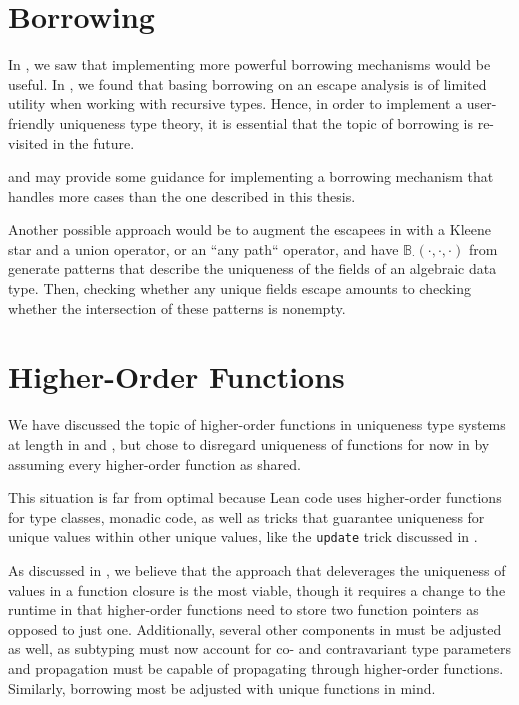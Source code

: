 \section{Borrowing}
In , we saw that implementing more powerful borrowing mechanisms would be useful. In , we found that basing borrowing on an escape analysis is of limited utility when working with recursive types. Hence, in order to implement a user-friendly uniqueness type theory, it is essential that the topic of borrowing is re-visited in the future.

\cite{spiwack_linearly_2022} and \cite{weiss_oxide_2021} may provide some guidance for implementing a borrowing mechanism that handles more cases than the one described in this thesis.

Another possible approach would be to augment the escapees in  with a Kleene star and a union operator, or an ``any path`` operator, and have $\mathbb{B}_\cdot(\cdot, \cdot, \cdot)$ from  generate patterns that describe the uniqueness of the fields of an algebraic data type. Then, checking whether any unique fields escape amounts to checking whether the intersection of these patterns is nonempty.

\section{Higher-Order Functions}
We have discussed the topic of higher-order functions in uniqueness type systems at length in  and , but chose to disregard uniqueness of functions for now in  by assuming every higher-order function as shared. 

This situation is far from optimal because Lean code uses higher-order functions for type classes, monadic code, as well as tricks that guarantee uniqueness for unique values within other unique values, like the \lstinline|update| trick discussed in . 

As discussed in , we believe that the approach that deleverages the uniqueness of values in a function closure is the most viable, though it requires a change to the runtime in that higher-order functions need to store two function pointers as opposed to just one. Additionally, several other components in  must be adjusted as well, as subtyping must now account for co- and contravariant type parameters and propagation must be capable of propagating through higher-order functions. Similarly, borrowing most be adjusted with unique functions in mind.

